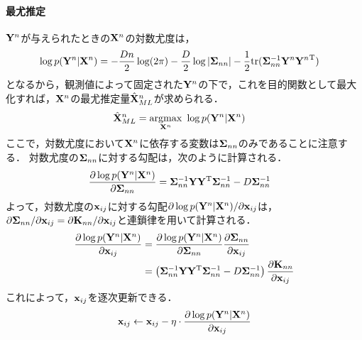 \documentclass[11pt,a4j]{article}
\begin{document}
        \paragraph{最尤推定}
          ${\bf Y}^n$が与えられたときの${\bf X}^n$の対数尤度は，
          \begin{align}
            \log p({\bf Y}^n|{\bf X}^n)
            &= -\frac{Dn}{2} \log (2 \pi) - \frac{D}{2} \log |{\bf \Sigma}_{nn}| - \frac{1}{2} {\rm tr} ({\bf \Sigma}_{nn}^{-1} {{\bf Y}^n}{{\bf Y}^n}^{\mathrm{T}})
          \end{align}
          となるから，観測値によって固定された${\bf Y}^n$の下で，これを目的関数として最大化すれば，${\bf X}^n$の最尤推定量$\hat{\bf X}^{n}_{ML}$が求められる．
          \begin{align}
            \hat{\bf X}^{n}_{ML} &= \underset{{\bf X}^n}{\rm argmax} ~ \log p( {\bf Y}^n | {\bf X}^n) 
          \end{align}
          ここで，対数尤度において${\bf X}^n$に依存する変数は${\bf \Sigma}_{nn}$のみであることに注意する．
          対数尤度の${\bf \Sigma}_{nn}$に対する勾配は，次のように計算される．
          \begin{align}
            \frac{\partial \log p({\bf Y}^n|{\bf X}^n)}{\partial {\bf \Sigma}_{nn}} &= {\bf \Sigma}_{nn}^{-1} {\bf Y}{\bf Y}^{\mathrm{T}} {\bf \Sigma}_{nn}^{-1} - D {\bf \Sigma}_{nn}^{-1} 
          \end{align}
          よって，対数尤度の${\bf x}_{ij}$に対する勾配$\partial \log p({\bf Y}^n|{\bf X}^n) / \partial {\bf x}_{ij}$は，
          $\partial {\bf \Sigma}_{nn} / \partial {\bf x}_{ij} = \partial {\bf K}_{nn} / \partial {\bf x}_{ij}$と連鎖律を用いて計算される．
          \begin{align}
            \frac{\partial \log p({\bf Y}^n | {\bf X}^n) }{ \partial {\bf x}_{ij} } 
            &= \frac{\partial \log p({\bf Y}^n | {\bf X}^n) }{\partial {\bf \Sigma}_{nn} } \frac{\partial {\bf \Sigma}_{nn}}{\partial {\bf x}_{ij} } \\
            &= \left( {\bf \Sigma}_{nn}^{-1} {\bf Y}{\bf Y}^{\mathrm{T}} {\bf \Sigma}_{nn}^{-1} - D {\bf \Sigma}_{nn}^{-1} \right) \frac{\partial {\bf K}_{nn} }{\partial {\bf x}_{ij} }
          \end{align}
          これによって，${\bf x}_{ij}$を逐次更新できる．
          \begin{align}
            {\bf x}_{ij} \gets {\bf x}_{ij} - \eta \cdot \frac{\partial \log p({\bf Y}^n | {\bf X}^n) }{ \partial {\bf x}_{ij} } 
          \end{align}
\end{document}
